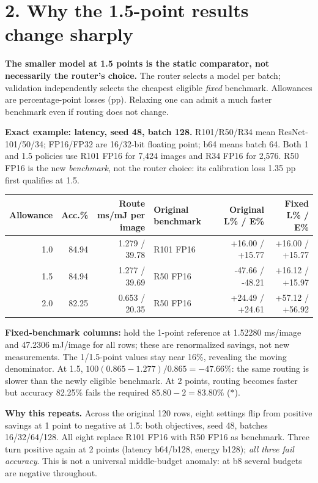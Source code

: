 \documentclass[10pt,a4paper]{article}
\begin{document}
\section*{2. Why the 1.5-point results change sharply}
\textbf{The smaller model at 1.5 points is the static comparator, not necessarily the router's choice.} The router selects a model per batch; validation independently selects the cheapest eligible \emph{fixed} benchmark. Allowances are percentage-point losses (pp). Relaxing one can admit a much faster benchmark even if routing does not change.

\textbf{Exact example: latency, seed 48, batch 128.} R101/R50/R34 mean ResNet-101/50/34; FP16/FP32 are 16/32-bit floating point; b64 means batch 64. Both 1 and 1.5 policies use R101 FP16 for 7,424 images and R34 FP16 for 2,576. R50 FP16 is the new \emph{benchmark}, not the router choice: its calibration loss 1.35 pp first qualifies at 1.5.
\begin{center}\footnotesize
\begin{tabular}{@{}rrrlrr@{}}\toprule
Allowance & Acc.\% & Route ms/mJ per image & Original benchmark & Original L\% / E\% & Fixed L\% / E\%\\\midrule
1.0&84.94&1.279 / 39.78&R101 FP16&+16.00 / +15.77&+16.00 / +15.77\\
1.5&84.94&1.277 / 39.69&R50 FP16&-47.66 / -48.21&+16.12 / +15.97\\
2.0&82.25\rlap{$^*$}&0.653 / 20.35&R50 FP16&+24.49 / +24.61&+57.12 / +56.92\\\bottomrule
\end{tabular}
\end{center}
\textbf{Fixed-benchmark columns:} hold the 1-point reference at 1.52280 ms/image and 47.2306 mJ/image for all rows; these are renormalized savings, not new measurements. The 1/1.5-point values stay near 16\%, revealing the moving denominator. At 1.5, $100(0.865-1.277)/0.865=-47.66\%$: the same routing is slower than the newly eligible benchmark. At 2 points, routing becomes faster but accuracy 82.25\% fails the required $85.80-2=83.80\%$ ($*$).

\textbf{Why this repeats.} Across the original 120 rows, eight settings flip from positive savings at 1 point to negative at 1.5: both objectives, seed 48, batches 16/32/64/128. All eight replace R101 FP16 with R50 FP16 as benchmark. Three turn positive again at 2 points (latency b64/b128, energy b128); \emph{all three fail accuracy}. This is not a universal middle-budget anomaly: at b8 several budgets are negative throughout.
\end{document}
